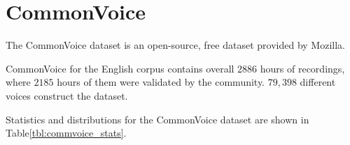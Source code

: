 
\section{CommonVoice}
The CommonVoice dataset is an open-source, 
free dataset provided by Mozilla\cite{commonVoiceDS}.

CommonVoice for the English corpus
contains overall \(2886\) hours of recordings, where
\(2185\) hours of them were validated by the community.
\(79,398\) different voices construct the dataset.
\bigskip

Statistics and distributions for the CommonVoice dataset 
are shown in Table\;\ref{tbl:commvoice_stats}.

